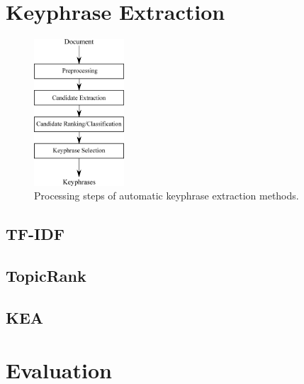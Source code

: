 \section{Keyphrase Extraction}
\label{sec:keyphrase_extraction}
  \begin{figure}
    \centering
    \includegraphics[width=0.3\textwidth]{include/processing_steps.eps}
    \caption{Processing steps of automatic keyphrase extraction methods.
             \label{fig:processing_steps}}
  \end{figure}

  \subsection{TF-IDF}
  \label{subsec:tfidf}
  \subsection{TopicRank}
  \label{subsec:topicrank}
  \subsection{KEA}
  \label{subsec:kea}

\section{Evaluation}
\label{sec:evaluation}

